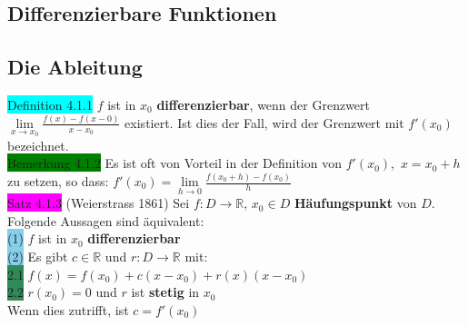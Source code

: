 \documentclass[landscape, 10pt]{article}
\newcommand{\R}{\mathbb{R}}
\begin{document}
\begin{multicols}{3}
\section{Differenzierbare Funktionen}
       \subsection{Die Ableitung}
              \colorbox{cyan}{Definition 4.1.1} 
                     $f$ ist in $x_0$ \textbf{differenzierbar}, 
                     wenn der Grenzwert \textcolor{NavyBlue}{
                     $\lim\limits_{x\to x_0}\frac{f(x)-f(x-0)}{x-x_0}$}
                     existiert. Ist dies der Fall, wird 
                     der Grenzwert mit \textcolor{NavyBlue}{$f'(x_0)$} bezeichnet.\\
              \colorbox{green}{Bemerkung 4.1.2} 
                     Es ist oft von Vorteil in der Definition von 
                     \textcolor{NavyBlue}{$f'(x_0)$},\,
                     \textcolor{NavyBlue}{$x=x_0+h$} zu setzen, so dass: 
                     \textcolor{NavyBlue}{
                     $f'(x_0)=\lim\limits_{h\to 0}\frac{f(x_0+h)-f(x_0)}{h}$}\\
              \colorbox{magenta}{Satz 4.1.3} (Weierstrass 1861) Sei 
                     \textcolor{NavyBlue}{$f:D\longrightarrow\R,\,x_0\in D$}
                     \textbf{Häufungspunkt} von \textcolor{NavyBlue}{$D$}. 
                     Folgende Aussagen sind 
                     äquivalent: \\
                     \colorbox{SkyBlue}{(1)} \textcolor{NavyBlue}{$f$} ist in 
                            \textcolor{NavyBlue}{$x_0$} 
                            \textbf{differenzierbar} \\
                     \colorbox{SkyBlue}{(2)} Es gibt 
                            \textcolor{NavyBlue}{$c\in\R$} und 
                            \textcolor{NavyBlue}{$r:D\longrightarrow\R$} mit: \\
                            \colorbox{SeaGreen}{2.1} 
                                   \textcolor{NavyBlue}{
                                   $f(x)=f(x_0)+c(x-x_0)+r(x)(x-x_0)$} \\
                            \colorbox{SeaGreen}{2.2} 
                                   \textcolor{NavyBlue}{$r(x_0)=0$} und 
                                   \textcolor{NavyBlue}{$r$} ist \textbf{stetig}
                                   in \textcolor{NavyBlue}{$x_0$}\\
                     Wenn dies zutrifft, ist \textcolor{NavyBlue}{$c=f'(x_0)$} 

\end{multicols}
\end{document}
